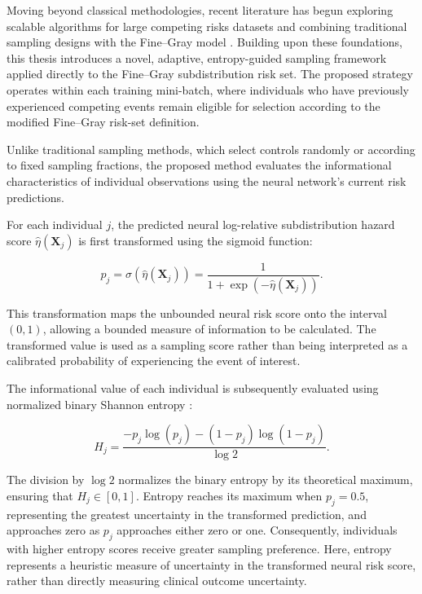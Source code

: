 \documentclass[a4paper,twoside,12pt]{report}
\begin{document}
Moving beyond classical methodologies, recent literature has begun exploring scalable algorithms for large competing risks datasets \cite{kawaguchi2020scalable} and combining traditional sampling designs with the Fine--Gray model \cite{kim2020stratified}. Building upon these foundations, this thesis introduces a novel, adaptive, entropy-guided sampling framework applied directly to the Fine--Gray subdistribution risk set. The proposed strategy operates within each training mini-batch, where individuals who have previously experienced competing events remain eligible for selection according to the modified Fine--Gray risk-set definition.

Unlike traditional sampling methods, which select controls randomly or according to fixed sampling fractions, the proposed method evaluates the informational characteristics of individual observations using the neural network's current risk predictions.

For each individual $j$, the predicted neural log-relative subdistribution hazard score $\hat{\eta}(\boldsymbol{X}_j)$ is first transformed using the sigmoid function:

\begin{equation}
p_j =
\sigma\left(\hat{\eta}(\boldsymbol{X}_j)\right)
=
\frac{1}{1+\exp(-\hat{\eta}(\boldsymbol{X}_j))}.
\end{equation}

This transformation maps the unbounded neural risk score onto the interval $(0,1)$, allowing a bounded measure of information to be calculated. The transformed value is used as a sampling score rather than being interpreted as a calibrated probability of experiencing the event of interest.

The informational value of each individual is subsequently evaluated using normalized binary Shannon entropy \citep{Shannon1948}:

\begin{equation}
H_j =
\frac{
-p_j\log(p_j)
-(1-p_j)\log(1-p_j)
}{\log 2}.
\end{equation}

The division by $\log 2$ normalizes the binary entropy by its theoretical maximum, ensuring that $H_j \in [0,1]$. Entropy reaches its maximum when $p_j=0.5$, representing the greatest uncertainty in the transformed prediction, and approaches zero as $p_j$ approaches either zero or one. Consequently, individuals with higher entropy scores receive greater sampling preference. Here, entropy represents a heuristic measure of uncertainty in the transformed neural risk score, rather than directly measuring clinical outcome uncertainty.
\end{document}
